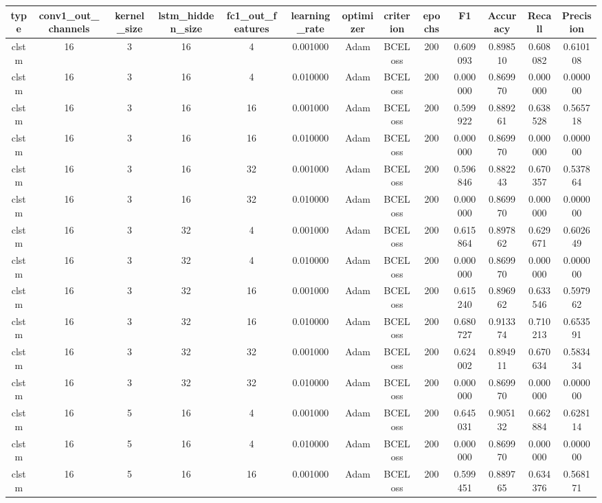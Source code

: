 \documentclass[10pt,twocolumn,letterpaper]{article}
\begin{document}
\begin{appendices}
{\begin{center}
   \begin{tabular}{ |c|c|c|c|c|c|c|c|c|c|c|c|c| }
      \hline
      type & conv1\_out\_channels & kernel\_size & lstm\_hidden\_size & fc1\_out\_features & learning\_rate & optimizer & criterion & epochs & F1 & Accuracy & Recall & Precision \\
      \hline
         clstm & 16 & 3 & 16 & 4 & 0.001000 & Adam & BCELoss & 200 & 0.609093 & 0.898510 & 0.608082 & 0.610108 \\
         clstm & 16 & 3 & 16 & 4 & 0.010000 & Adam & BCELoss & 200 & 0.000000 & 0.869970 & 0.000000 & 0.000000 \\
         clstm & 16 & 3 & 16 & 16 & 0.001000 & Adam & BCELoss & 200 & 0.599922 & 0.889261 & 0.638528 & 0.565718 \\
         clstm & 16 & 3 & 16 & 16 & 0.010000 & Adam & BCELoss & 200 & 0.000000 & 0.869970 & 0.000000 & 0.000000 \\
         clstm & 16 & 3 & 16 & 32 & 0.001000 & Adam & BCELoss & 200 & 0.596846 & 0.882243 & 0.670357 & 0.537864 \\
         clstm & 16 & 3 & 16 & 32 & 0.010000 & Adam & BCELoss & 200 & 0.000000 & 0.869970 & 0.000000 & 0.000000 \\
         clstm & 16 & 3 & 32 & 4 & 0.001000 & Adam & BCELoss & 200 & 0.615864 & 0.897862 & 0.629671 & 0.602649 \\
         clstm & 16 & 3 & 32 & 4 & 0.010000 & Adam & BCELoss & 200 & 0.000000 & 0.869970 & 0.000000 & 0.000000 \\
         clstm & 16 & 3 & 32 & 16 & 0.001000 & Adam & BCELoss & 200 & 0.615240 & 0.896962 & 0.633546 & 0.597962 \\
         clstm & 16 & 3 & 32 & 16 & 0.010000 & Adam & BCELoss & 200 & 0.680727 & 0.913374 & 0.710213 & 0.653591 \\
         clstm & 16 & 3 & 32 & 32 & 0.001000 & Adam & BCELoss & 200 & 0.624002 & 0.894911 & 0.670634 & 0.583434 \\
         clstm & 16 & 3 & 32 & 32 & 0.010000 & Adam & BCELoss & 200 & 0.000000 & 0.869970 & 0.000000 & 0.000000 \\
         clstm & 16 & 5 & 16 & 4 & 0.001000 & Adam & BCELoss & 200 & 0.645031 & 0.905132 & 0.662884 & 0.628114 \\
         clstm & 16 & 5 & 16 & 4 & 0.010000 & Adam & BCELoss & 200 & 0.000000 & 0.869970 & 0.000000 & 0.000000 \\
         clstm & 16 & 5 & 16 & 16 & 0.001000 & Adam & BCELoss & 200 & 0.599451 & 0.889765 & 0.634376 & 0.568171 \\

\end{tabular}
\end{center}}
\end{appendices}
\end{document}
